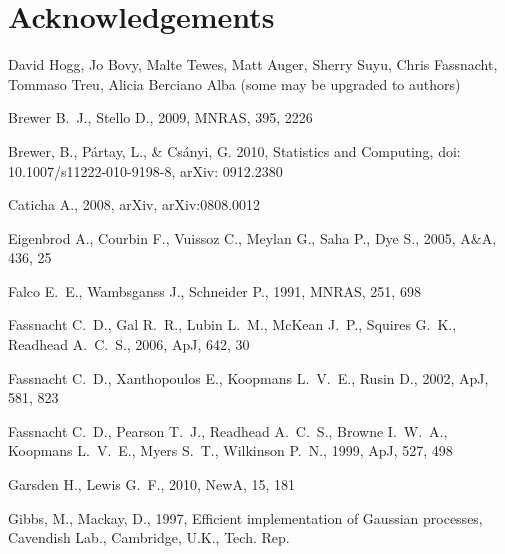 \documentclass[useAMS,usenatbib, a4paper]{mn2e} \usepackage{natbib}
\begin{document}

\section{Acknowledgements}
David Hogg, Jo Bovy, Malte Tewes, Matt Auger, Sherry Suyu, Chris Fassnacht, Tommaso Treu, Alicia Berciano Alba
(some may be upgraded to authors)


\begin{thebibliography}{99} 
 Brewer B.~J., Stello D., 2009, MNRAS, 395, 2226

Brewer, B., P\'{a}rtay, L., \& Cs\'{a}nyi, G. 2010, Statistics and Computing, doi: 10.1007/s11222-010-9198-8, arXiv: 0912.2380

Caticha A., 2008, arXiv, arXiv:0808.0012 

 Eigenbrod A., Courbin F., Vuissoz C., Meylan G., Saha P., Dye S., 2005, A\&A, 436, 25 

 Falco E.~E., Wambsganss J., Schneider P., 1991, MNRAS, 251, 698 

 Fassnacht C.~D., Gal R.~R., Lubin L.~M., 
McKean J.~P., Squires G.~K., Readhead A.~C.~S., 2006, ApJ, 642, 30 

 Fassnacht C.~D., Xanthopoulos E., Koopmans 
L.~V.~E., Rusin D., 2002, ApJ, 581, 823 

 Fassnacht C.~D., Pearson T.~J., Readhead 
A.~C.~S., Browne I.~W.~A., Koopmans L.~V.~E., Myers S.~T., Wilkinson P.~N., 
1999, ApJ, 527, 498 

 Garsden H., Lewis G.~F., 2010, NewA, 15, 181 

Gibbs, M., Mackay, D., 1997, Efficient implementation of Gaussian processes, Cavendish Lab., Cambridge, U.K., Tech. Rep.


\end{thebibliography}
\end{document}
